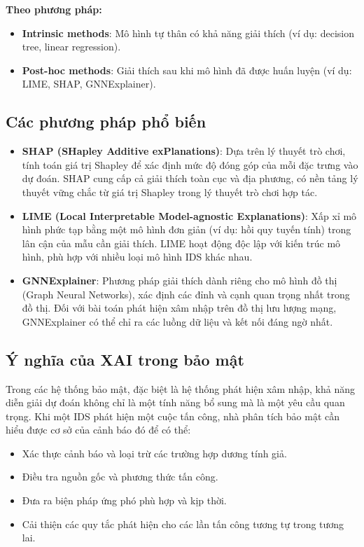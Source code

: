 \textbf{Theo phương pháp:}
\begin{itemize}
    \item \textbf{Intrinsic methods}: Mô hình tự thân có khả năng giải thích (ví dụ: decision tree, linear regression).
    \item \textbf{Post-hoc methods}: Giải thích sau khi mô hình đã được huấn luyện (ví dụ: LIME, SHAP, GNNExplainer).
\end{itemize}

\subsection{Các phương pháp phổ biến}
\begin{itemize}
    \item \textbf{SHAP (SHapley Additive exPlanations)}: Dựa trên lý thuyết trò chơi, tính toán giá trị Shapley để xác định mức độ đóng góp của mỗi đặc trưng vào dự đoán. SHAP cung cấp cả giải thích toàn cục và địa phương, có nền tảng lý thuyết vững chắc từ giá trị Shapley trong lý thuyết trò chơi hợp tác.
    \item \textbf{LIME (Local Interpretable Model-agnostic Explanations)}: Xấp xỉ mô hình phức tạp bằng một mô hình đơn giản (ví dụ: hồi quy tuyến tính) trong lân cận của mẫu cần giải thích. LIME hoạt động độc lập với kiến trúc mô hình, phù hợp với nhiều loại mô hình IDS khác nhau.
    \item \textbf{GNNExplainer}: Phương pháp giải thích dành riêng cho mô hình đồ thị (Graph Neural Networks), xác định các đỉnh và cạnh quan trọng nhất trong đồ thị. Đối với bài toán phát hiện xâm nhập trên đồ thị lưu lượng mạng, GNNExplainer có thể chỉ ra các luồng dữ liệu và kết nối đáng ngờ nhất.
\end{itemize}

\subsection{Ý nghĩa của XAI trong bảo mật}
Trong các hệ thống bảo mật, đặc biệt là hệ thống phát hiện xâm nhập, khả năng diễn giải dự đoán không chỉ là một tính năng bổ sung mà là một yêu cầu quan trọng. Khi một IDS phát hiện một cuộc tấn công, nhà phân tích bảo mật cần hiểu được cơ sở của cảnh báo đó để có thể:
\begin{itemize}
    \item Xác thực cảnh báo và loại trừ các trường hợp dương tính giả.
    \item Điều tra nguồn gốc và phương thức tấn công.
    \item Đưa ra biện pháp ứng phó phù hợp và kịp thời.
    \item Cải thiện các quy tắc phát hiện cho các lần tấn công tương tự trong tương lai.
\end{itemize}

